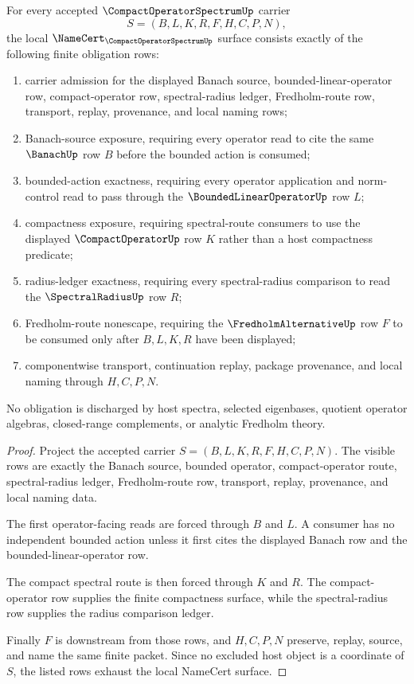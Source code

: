 \begin{theorem}
\label{thm:compact-operator-spectrum-namecert-obligations}
For every accepted $\CompactOperatorSpectrumUp$ carrier
$$
S=(B,L,K,R,F,H,C,P,N),
$$
the local $\NameCert_{\CompactOperatorSpectrumUp}$ surface consists exactly of the following finite obligation rows:
\begin{enumerate}
\item carrier admission for the displayed Banach source, bounded-linear-operator row, compact-operator row, spectral-radius ledger, Fredholm-route row, transport, replay, provenance, and local naming rows;
\item Banach-source exposure, requiring every operator read to cite the same $\BanachUp$ row $B$ before the bounded action is consumed;
\item bounded-action exactness, requiring every operator application and norm-control read to pass through the $\BoundedLinearOperatorUp$ row $L$;
\item compactness exposure, requiring spectral-route consumers to use the displayed $\CompactOperatorUp$ row $K$ rather than a host compactness predicate;
\item radius-ledger exactness, requiring every spectral-radius comparison to read the $\SpectralRadiusUp$ row $R$;
\item Fredholm-route nonescape, requiring the $\FredholmAlternativeUp$ row $F$ to be consumed only after $B,L,K,R$ have been displayed;
\item componentwise transport, continuation replay, package provenance, and local naming through $H,C,P,N$.
\end{enumerate}
No obligation is discharged by host spectra, selected eigenbases, quotient operator algebras, closed-range complements, or analytic Fredholm theory.
\end{theorem}
\begin{proof}
Project the accepted carrier $S=(B,L,K,R,F,H,C,P,N)$. The visible rows are exactly the Banach source, bounded operator, compact-operator route, spectral-radius ledger, Fredholm-route row, transport, replay, provenance, and local naming data.

The first operator-facing reads are forced through $B$ and $L$. A consumer has no independent bounded action unless it first cites the displayed Banach row and the bounded-linear-operator row.

The compact spectral route is then forced through $K$ and $R$. The compact-operator row supplies the finite compactness surface, while the spectral-radius row supplies the radius comparison ledger.

Finally $F$ is downstream from those rows, and $H,C,P,N$ preserve, replay, source, and name the same finite packet. Since no excluded host object is a coordinate of $S$, the listed rows exhaust the local NameCert surface.
\end{proof}

